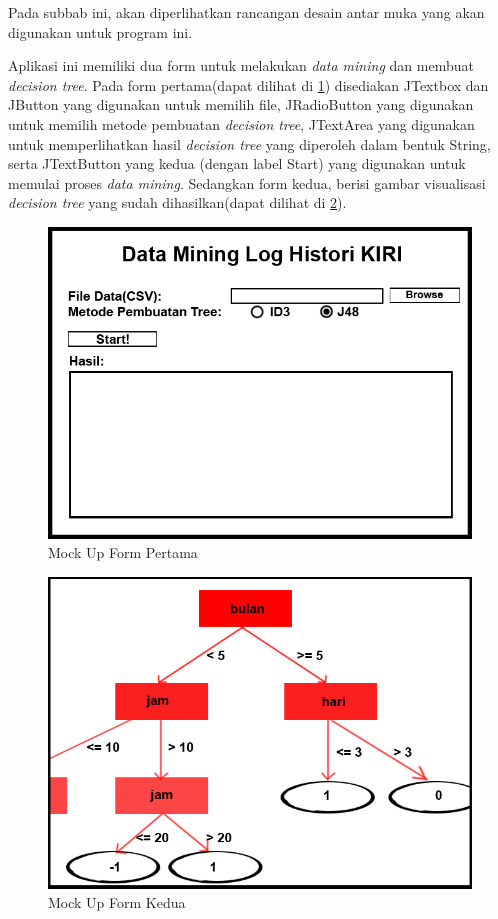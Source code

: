 Pada subbab ini, akan diperlihatkan rancangan desain antar muka yang akan digunakan untuk program ini.

Aplikasi ini memiliki dua form untuk melakukan \textsl{data mining} dan membuat \textsl{decision tree}. Pada form pertama(dapat dilihat di \ref{fig:MU1}) disediakan JTextbox dan JButton yang digunakan untuk memilih file, JRadioButton yang digunakan untuk memilih metode pembuatan \textsl{decision tree}, JTextArea yang digunakan untuk memperlihatkan hasil \textsl{decision tree} yang diperoleh dalam bentuk String, serta JTextButton yang kedua (dengan label Start) yang digunakan untuk memulai proses \textsl{data mining}. Sedangkan form kedua, berisi gambar visualisasi \textsl{decision tree} yang sudah dihasilkan(dapat dilihat di \ref{fig:MU2}).
\begin{figure}[H]
\centering
\includegraphics[scale=1.2]{Gambar/mockUp1.jpg}
\caption[Mock Up Form Pertama]{Mock Up Form Pertama} 
\label{fig:MU1}
\end{figure}

\begin{figure}[H]
\centering
\includegraphics[scale=1.2]{Gambar/mockUp2.jpg}
\caption[Mock Up Form Kedua]{Mock Up Form Kedua} 
\label{fig:MU2}
\end{figure}